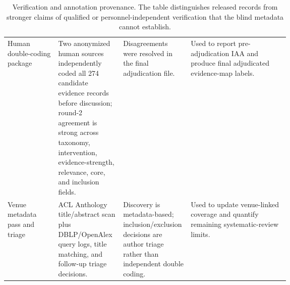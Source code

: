 \begin{table}[t]
\begin{tabularx}{\linewidth}{>{\raggedright\arraybackslash}p{0.18\linewidth}>{\raggedright\arraybackslash}p{0.23\linewidth}>{\raggedright\arraybackslash}p{0.24\linewidth}X}
Human double-coding package & Two anonymized human sources independently coded all 274 candidate evidence records before discussion; round-2 agreement is strong across taxonomy, intervention, evidence-strength, relevance, core, and inclusion fields. & Disagreements were resolved in the final adjudication file. & Used to report pre-adjudication IAA and produce final adjudicated evidence-map labels. \\
Venue metadata pass and triage & ACL Anthology title/abstract scan plus DBLP/OpenAlex query logs, title matching, and follow-up triage decisions. & Discovery is metadata-based; inclusion/exclusion decisions are author triage rather than independent double coding. & Used to update venue-linked coverage and quantify remaining systematic-review limits. \\
\bottomrule
\end{tabularx}
\caption{Verification and annotation provenance. The table distinguishes released records from stronger claims of qualified or personnel-independent verification that the blind metadata cannot establish.}
\label{tab:verification-provenance}
\end{table}
